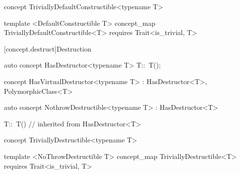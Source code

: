 \documentclass[american,twoside]{book}
\begin{document}
\begin{itemdecl}
concept TriviallyDefaultConstructible<typename T> { }

template <DefaultConstructible T>
concept_map TriviallyDefaultConstructible<T>
requires Trait<is_trivial, T> 
{ }
\end{itemdecl}

\begin{itemdescr}
\pnum
{}
\end{itemdescr}

[concept.destruct]{Destruction}
\begin{itemdecl}
auto concept HasDestructor<typename T> {
  T::~T();
}
\end{itemdecl}

\begin{itemdescr}
\pnum
{}
\end{itemdescr}

\begin{itemdecl}
concept HasVirtualDestructor<typename T> : HasDestructor<T>, PolymorphicClass<T> { }
\end{itemdecl}

\begin{itemdescr}
\pnum
{}

\pnum
{}
\end{itemdescr}

\begin{itemdecl}
auto concept NothrowDestructible<typename T> : HasDestructor<T> { }
\end{itemdecl}

\begin{itemdescr}
\begin{codeblock}
T::~T() // inherited from HasDestructor<T>
\end{codeblock}
\pnum
{}
\end{itemdescr}

\begin{itemdecl}
concept TriviallyDestructible<typename T> { }

template <NoThrowDestructible T>
concept_map TriviallyDestructible<T>
requires Trait<is_trivial, T> 
{ }
\end{itemdecl}
\end{document}
